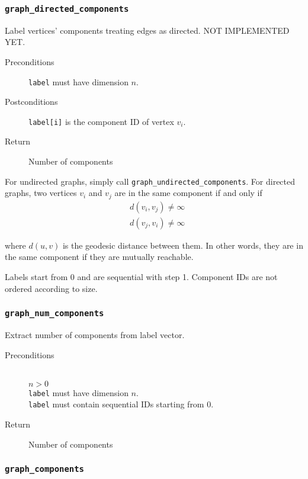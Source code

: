 \subsubsection{\texttt{graph\_directed\_components}}

Label vertices' components treating edges as directed. NOT IMPLEMENTED YET.

\begin{description}
 \item[Preconditions] \texttt{label} must have dimension $n$.
 \item[Postconditions] \texttt{label[i]} is the component ID of vertex $v_i$.
 \item[Return] Number of components
\end{description}

For undirected graphs, simply call \texttt{graph\_undirected\_components}. For 
directed graphs, two vertices $v_i$ and $v_j$ are in the same component if and
only if
\begin{align*}
 &d(v_i, v_j) \neq \infty \\
 &d(v_j, v_i) \neq \infty
\end{align*}

where $d(u,v)$ is the geodesic distance between them. In other words, they are
in the same component if they are mutually reachable.

Labels start from 0 and are sequential with step 1.
Component IDs are not ordered according to size.

\subsubsection{\texttt{graph\_num\_components}}

Extract number of components from label vector.

\begin{description}
 \item[Preconditions] ~\\
   $n > 0$ \\
   \texttt{label} must have dimension $n$. \\
   \texttt{label} must contain sequential IDs starting from 0.
 \item[Return] Number of components
\end{description}

\subsubsection{\texttt{graph\_components}}

